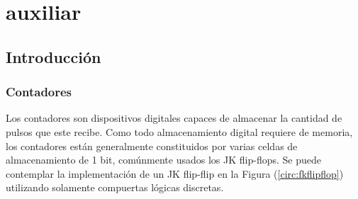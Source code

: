 

\section{auxiliar}
\tableofcontents

\subsection{Introducción}
\subsubsection{Contadores}
		Los contadores son dispositivos digitales capaces de almacenar la cantidad de pulsos que este recibe. Como todo almacenamiento digital requiere de memoria, los contadores están generalmente constituidos por varias celdas de almacenamiento de 1 bit, comúnmente usados los JK flip-flops. Se puede contemplar la implementación de un JK flip-flip en la Figura (\ref{circ:fkflipflop}) utilizando solamente compuertas lógicas discretas. 
		
